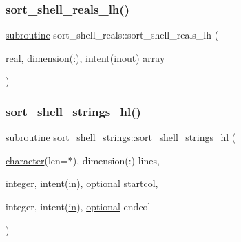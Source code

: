 \mbox{\label{M__sort_8f90_ab8554ae60b996aa5dea2c52607efa551}} 
\subsubsection{\texorpdfstring{sort\+\_\+shell\+\_\+reals\+\_\+lh()}{sort\_shell\_reals\_lh()}}
{\footnotesize\ttfamily \hyperlink{M__stopwatch_83_8txt_acfbcff50169d691ff02d4a123ed70482}{subroutine} sort\+\_\+shell\+\_\+reals\+::sort\+\_\+shell\+\_\+reals\+\_\+lh (\begin{DoxyParamCaption}\item[{\hyperlink{read__watch_83_8txt_abdb62bde002f38ef75f810d3a905a823}{real}, dimension(\+:), intent(inout)}]{array }\end{DoxyParamCaption})\hspace{0.3cm}{\ttfamily [private]}}

\mbox{\label{M__sort_8f90_a16bd54666fe44ae00984394bdeb454b1}} 
\subsubsection{\texorpdfstring{sort\+\_\+shell\+\_\+strings\+\_\+hl()}{sort\_shell\_strings\_hl()}}
{\footnotesize\ttfamily \hyperlink{M__stopwatch_83_8txt_acfbcff50169d691ff02d4a123ed70482}{subroutine} sort\+\_\+shell\+\_\+strings\+::sort\+\_\+shell\+\_\+strings\+\_\+hl (\begin{DoxyParamCaption}\item[{\hyperlink{option__stopwatch_83_8txt_abd4b21fbbd175834027b5224bfe97e66}{character}(len=$\ast$), dimension(\+:)}]{lines,  }\item[{integer, intent(\hyperlink{M__journal_83_8txt_afce72651d1eed785a2132bee863b2f38}{in}), \hyperlink{option__stopwatch_83_8txt_aa4ece75e7acf58a4843f70fe18c3ade5}{optional}}]{startcol,  }\item[{integer, intent(\hyperlink{M__journal_83_8txt_afce72651d1eed785a2132bee863b2f38}{in}), \hyperlink{option__stopwatch_83_8txt_aa4ece75e7acf58a4843f70fe18c3ade5}{optional}}]{endcol }\end{DoxyParamCaption})\hspace{0.3cm}{\ttfamily [private]}}



